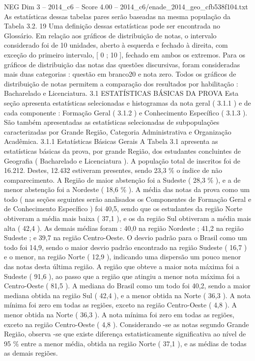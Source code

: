 \begin{textsample}{NEG Dim 3 – 2014\_c6 – Score 4.00 – 2014\_c6/enade\_2014\_geo\_cfb538f104.txt}
As estatísticas dessas tabelas pares serão baseadas na mesma população da Tabela 3.2. 19 Uma definição dessas estatísticas pode ser encontrada no Glossário.
Em relação aos gráficos de distribuição de notas, o intervalo considerado foi de 10 unidades, aberto à esquerda e fechado à direita, com exceção do primeiro intervalo, [ 0 ; 10 ], fechado em ambos os extremos.
Para os gráficos de distribuição das notas das questões discursivas, foram consideradas mais duas categorias : questão em branco20 e nota zero.
Todos os gráficos de distribuição de notas permitem a comparação dos resultados por habilitação : Bacharelado e Licenciatura. 3.1 ESTATÍSTICAS BÁSICAS DA PROVA Esta seção apresenta estatísticas selecionadas e histogramas da nota geral ( 3.1.1 ) e de cada componente : Formação Geral ( 3.1.2 ) e Conhecimento Específico ( 3.1.3 ).
São também apresentadas as estatísticas selecionadas de subpopulações caracterizadas por Grande Região, Categoria Administrativa e Organização Acadêmica. 3.1.1 Estatísticas Básicas Gerais A Tabela 3.1 apresenta as estatísticas básicas da prova, por grande Região, dos estudantes concluintes de Geografia ( Bacharelado e Licenciatura ).
A população total de inscritos foi de 16.212.
Destes, 12.432 estiveram presentes, sendo 23,3 \% o índice de não comparecimento.
A Região de maior abstenção foi a Sudeste ( 28,3 \% ), e a de menor abstenção foi a Nordeste ( 18,6 \% ).
A média das notas da prova como um todo ( nas seções seguintes serão analisados os Componentes de Formação Geral e de Conhecimento Específico ) foi 40,5, sendo que os estudantes da região Norte obtiveram a média mais baixa ( 37,1 ), e os da região Sul obtiveram a média mais alta ( 42,4 ).
As demais médias foram : 40,0 na região Nordeste ; 41,2 na região Sudeste ; e 39,7 na região Centro-Oeste.
O desvio padrão para o Brasil como um todo foi 14,9, sendo o maior desvio padrão encontrado na região Sudeste ( 16,7 ) e o menor, na região Norte ( 12,9 ), indicando uma dispersão um pouco menor das notas desta última região.
A região que obteve a maior nota máxima foi a Sudeste ( 91,6 ), ao passo que a região que atingiu a menor nota máxima foi a Centro-Oeste ( 81,5 ).
A mediana do Brasil como um todo foi 40,2, sendo a maior mediana obtida na região Sul ( 42,4 ), e a menor obtida na Norte ( 36,3 ).
A nota mínima foi zero em todas as regiões, exceto na região Centro-Oeste ( 4,8 ).
A menor obtida na Norte ( 36,3 ).
A nota mínima foi zero em todas as regiões, exceto na região Centro-Oeste ( 4,8 ).
Considerando -se as notas segundo Grande Região, observa -se que existe diferença estatisticamente significativa ao nível de 95 \% entre a menor média, obtida na região Norte ( 37,1 ), e as médias de todas as demais regiões.

\end{textsample}
